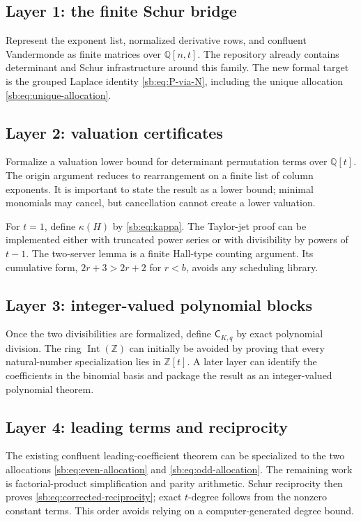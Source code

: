 \documentclass[11pt]{article}
\theoremstyle{definition}
\theoremstyle{remark}
\newcommand{\Z}{\mathbb Z}
\newcommand{\Q}{\mathbb Q}
\newcommand{\IntZ}{\operatorname{Int}(\Z)}
\newcommand{\Cblock}{\mathsf C}
\theoremstyle{definition}
\theoremstyle{plain}
\numberwithin{equation}{section}
\begin{document}
\subsection{Layer 1: the finite Schur bridge}
Represent the exponent list, normalized derivative rows, and confluent
Vandermonde as finite matrices over $\Q[n,t]$.  The repository already
contains determinant and Schur infrastructure around this family.  The new
formal target is the grouped Laplace identity \eqref{sb:eq:P-via-N}, including
the unique allocation \eqref{sb:eq:unique-allocation}.


\subsection{Layer 2: valuation certificates}
Formalize a valuation lower bound for determinant permutation terms over
$\Q[t]$.  The origin argument reduces to rearrangement on a finite list of
column exponents.  It is important to state the result as a lower bound;
minimal monomials may cancel, but cancellation cannot create a lower
valuation.

For $t=1$, define $\kappa(H)$ by \eqref{sb:eq:kappa}.  The Taylor-jet proof can
be implemented either with truncated power series or with divisibility by
powers of $t-1$.  The two-server lemma is a finite Hall-type counting
argument.  Its cumulative form, $2r+3>2r+2$ for $r<b$, avoids any scheduling
library.

\subsection{Layer 3: integer-valued polynomial blocks}
Once the two divisibilities are formalized, define $\Cblock_{K,q}$ by exact
polynomial division.  The ring $\IntZ$ can initially be avoided by proving
that every natural-number specialization lies in $\Z[t]$.  A later layer can
identify the coefficients in the binomial basis and package the result as an
integer-valued polynomial theorem.

\subsection{Layer 4: leading terms and reciprocity}
The existing confluent leading-coefficient theorem can be specialized to the
two allocations \eqref{sb:eq:even-allocation} and
\eqref{sb:eq:odd-allocation}.  The remaining work is factorial-product
simplification and parity arithmetic.  Schur reciprocity then proves
\eqref{sb:eq:corrected-reciprocity}; exact $t$-degree follows from the nonzero
constant terms.  This order avoids relying on a computer-generated degree
bound.
\end{document}
